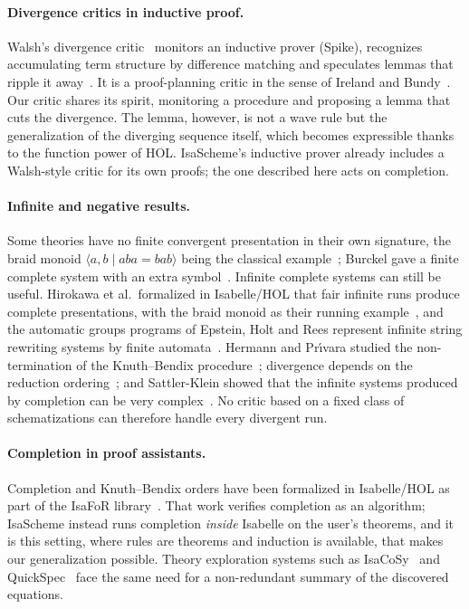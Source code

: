 \documentclass[preprint,12pt]{elsarticle}
\begin{document}
\paragraph{Divergence critics in inductive proof.}
Walsh's divergence critic~\cite{Walsh94,Walsh96} monitors an inductive
prover (Spike), recognizes accumulating term structure by difference
matching and speculates lemmas that ripple it away~\cite{Bundy05}. It is a
proof-planning critic in the sense of Ireland and Bundy~\cite{IrelandBundy96}.
Our critic shares its spirit, monitoring a procedure and proposing a lemma
that cuts the divergence. The lemma, however, is not a wave rule but the
generalization of the diverging sequence itself, which becomes expressible
thanks to the function power of HOL. IsaScheme's inductive
prover already includes a Walsh-style critic for its own proofs; the one
described here acts on completion.

\paragraph{Infinite and negative results.}
Some theories have no finite convergent presentation in their own
signature, the braid monoid $\langle a, b \mid aba = bab\rangle$ being the
classical example~\cite{KapurNarendran85}; Burckel gave a finite complete
system with an extra symbol~\cite{Burckel01}. Infinite complete systems can
still be useful. Hirokawa et al.\ formalized in Isabelle/HOL that fair
infinite runs produce complete presentations, with the braid monoid as
their running example~\cite{HirokawaMiddeldorpSternagelWinkler17}, and
the automatic groups programs of Epstein, Holt and Rees represent infinite
string rewriting systems by finite automata~\cite{EpsteinHoltRees91}.
Hermann and Pr\'{\i}vara studied the non-termination of the Knuth--Bendix
procedure~\cite{HermannPrivara86}; divergence depends on the reduction
ordering~\cite{Lescanne86,Dershowitz89}; and Sattler-Klein showed that the
infinite systems produced by completion can be very
complex~\cite{SattlerKlein91}. No critic based on a fixed class of
schematizations can therefore handle every divergent run.

\paragraph{Completion in proof assistants.}
Completion and Knuth--Bendix orders have been formalized in Isabelle/HOL as
part of the IsaFoR library~\cite{SternagelThiemann13,HirokawaMiddeldorpSternagel14,HirokawaMiddeldorpSternagelWinkler17}.
That work verifies completion as an algorithm; IsaScheme instead runs
completion \emph{inside} Isabelle on the user's theorems, and it is this
setting, where rules are theorems and induction is available, that makes
our generalization possible. Theory exploration systems such as
IsaCoSy~\cite{JohanssonDixonBundy11} and QuickSpec~\cite{ClaessenSmallboneHughes10}
face the same need for a non-redundant summary of the discovered equations.
\end{document}
